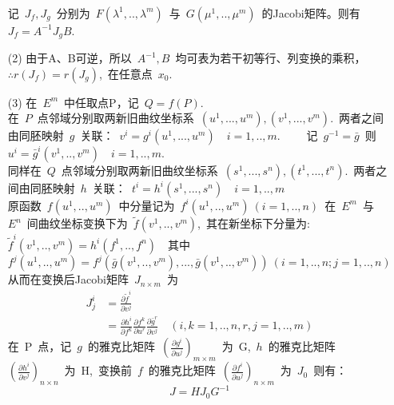 \begin{itemize}
\\
记\ $J_f,J_g$\ 分别为\ $F(\lambda^1,..,\lambda^m)$\ 与\ $G(\mu^1,..,\mu^m)$\ 的Jacobi矩阵。则有\ $J_f=A^{-1}J_gB$.
\item [(2)]
 由于A、B可逆，所以\ $A^{-1},B$\ 均可表为若干初等行、列变换的乘积，
 \\
  $\therefore r(J_f)=r(J_g)$,\ 在任意点\ $x_0.$
\item [(3)]
	在\ $E^m$\ 中任取点P，记\ $Q=f(P)$.
	\\
	在\ $P$\ 点邻域分别取两新旧曲纹坐标系\ $(u^1,...,u^m),(v^1,...,v^m)$.\
	两者之间由同胚映射\ $g$\ 关联：\ $v^i=g^i(u^1,...,u^m)\quad i=1,..,m. \qquad $ 记\ $g^{-1}=\bar{g}$\ 则\ $u^i=\bar{g}^i(v^1,..,v^m)\quad i=1,..,m.$
	\\
	同样在\ $Q$\ 点邻域分别取两新旧曲纹坐标系\ $(s^1,...,s^n),(t^1,...,t^n)$.\
	两者之间由同胚映射\ $h$\ 关联：\ $t^i=h^i(s^1,...,s^n)\quad i=1,..,m$
	\\
	原函数\ $f(u^1,..,u^m)$\ 中分量记为\ $f^i(u^1,..,u^m)\ (i=1,..,n)$\ 在\ $E^m$\ 与\ $E^n$\ 间曲纹坐标变换下为\ $\tilde{f}(v^1,..,v^m)$,\ 其在新坐标下分量为:	$\tilde{f}^i(v^1,..,v^m)=h^i(f^1,..,f^n)\quad $其中\ $f^j(u^1,..,u^m)=f^j(\bar{g}(v^1,..,v^m),...,\bar{g}(v^1,..,v^m))\ (i=1,..,n;j=1,..,n)$
	\\
	从而在变换后Jacobi矩阵\ $J_{n\times m}$\ 为
	\begin{align*}
	J_j^i&=\frac{\partial\tilde{f}^i}{\partial v^j}
	\\
	     &=\frac{\partial h^i}{\partial f^k}\frac{\partial f^k}{\partial u^r}\frac{\partial \bar{g}^r}{\partial v^j}\quad(i,k=1,..,n,r,j=1,..,m)
	\end{align*}
	在\ P\ 点，记\ $g$\ 的雅克比矩阵\ $(\frac{\partial g^i}{\partial u^j})_{m\times m}$\ 为\ G,\ $h$\ 的雅克比矩阵\ $(\frac{\partial h^i}{\partial v^j})_{n\times n}$\ 为\ H,\ 变换前\ $f$\ 的雅克比矩阵\ $(\frac{\partial f^i}{\partial u^j})_{n\times m}$\ 为\ $J_0$\ 则有：
	$$J=HJ_0G^{-1}$$
\end{itemize}

